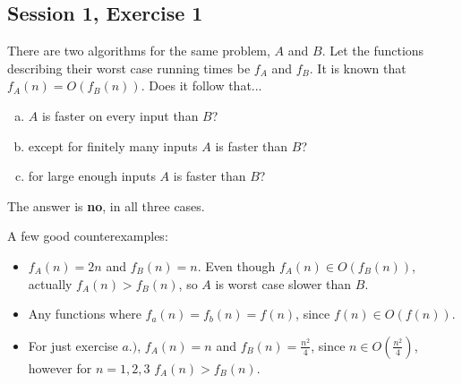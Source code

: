 \subsection{Session 1, Exercise 1}


There are two algorithms for the same problem, $A$ and $B$. Let the functions describing their worst case running times be $f_A$ and $f_B$. It is known that $f_A(n) = O(f_B(n))$. Does it follow that...

\begin{enumerate}[a.)]
\item $A$ is faster on every input than $B$?
\item except for finitely many inputs $A$ is faster than $B$?
\item for large enough inputs $A$ is faster than $B$?
\end{enumerate}


The answer is \textbf{no}, in all three cases.

A few good counterexamples:
\begin{itemize}
    \item $f_A(n) = 2n$ and $f_B(n)=n$. Even though $f_A(n)\in{}O(f_B(n))$, actually $f_A(n) > f_B(n)$, so $A$ is worst case slower than $B$.
    \item Any functions where $f_a(n) = f_b(n) = f(n)$, since $f(n)\in{}O(f(n))$.
    \item For just exercise $a.)$, $f_A(n) = n$ and $f_B(n)=\frac{n^2}{4}$, since $n\in{}O(\frac{n^2}{4})$, however for $n=1,2,3$ $f_A(n)>f_B(n)$.
\end{itemize}


